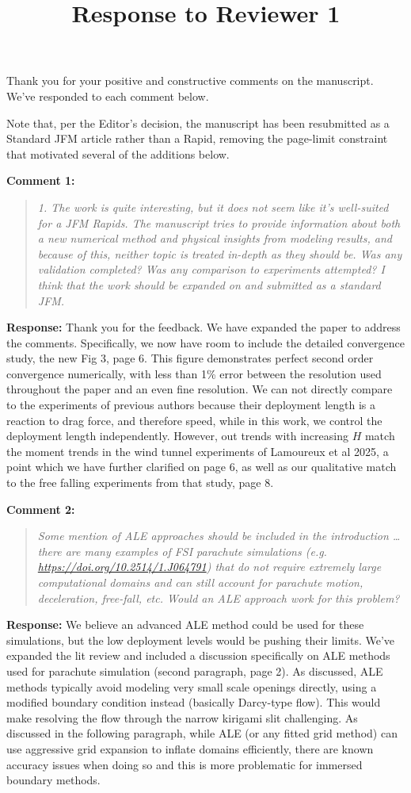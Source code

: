 \documentclass[11pt]{article}
\title{Response to Reviewer 1}
\author{}
\date{}
\newenvironment{comment}[1]{\vspace{4mm}\par\noindent\textbf{Comment #1:}\begin{quote}\itshape}{\end{quote}}
\newcommand{\response}[1]{\par\noindent\textbf{Response:} #1}
\begin{document}
\maketitle

Thank you for your positive and constructive comments on the manuscript. We've responded to each comment below. 

Note that, per the Editor's decision, the manuscript has been resubmitted
as a Standard JFM article rather than a Rapid, removing the page-limit constraint that motivated several of the additions below.

\begin{comment}{1}
1. The work is quite interesting, but it does not seem like it's well-suited for a JFM
Rapids. The manuscript tries to provide information about both a new numerical method
and physical insights from modeling results, and because of this, neither topic is
treated in-depth as they should be. Was any validation completed? Was any comparison
to experiments attempted? I think that the work should be expanded on and submitted
as a standard JFM.
\end{comment}
\response{}
Thank you for the feedback. We have expanded the paper to address the comments. Specifically, we now have room to include the detailed convergence study, the new Fig 3, page 6. This figure demonstrates perfect second order convergence numerically, with less than 1\% error between the resolution used throughout the paper and an even fine resolution. We can not directly compare to the experiments of previous authors because their deployment length is a reaction to drag force, and therefore speed, while in this work, we control the deployment length independently. However, out trends with increasing $H$ match the moment trends in the wind tunnel experiments of Lamoureux et al 2025, a point which we have further clarified on page 6, as well as our qualitative match to the free falling experiments from that study, page 8.  

\begin{comment}{2}
Some mention of ALE approaches should be included in the introduction \ldots there are
many examples of FSI parachute simulations (e.g. \url{https://doi.org/10.2514/1.J064791})
that do not require extremely large computational domains and can still account for
parachute motion, deceleration, free-fall, etc. Would an ALE approach work for this
problem?
\end{comment}
\response{}
We believe an advanced ALE method could be used for these simulations, but the low deployment levels would be pushing their limits. We've expanded the lit review and included a discussion specifically on ALE methods used for parachute simulation (second paragraph, page 2). As discussed, ALE methods typically avoid modeling very small scale openings directly, using a modified boundary condition instead (basically Darcy-type flow). This would make resolving the flow through the narrow kirigami slit challenging. As discussed in the following paragraph, while ALE (or any fitted grid method) can use aggressive grid expansion to inflate domains efficiently, there are known accuracy issues when doing so and this is more problematic for immersed boundary methods. 
\end{document}
